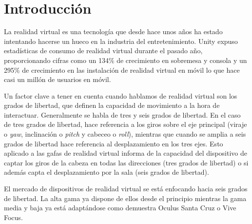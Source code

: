








\pagestyle{empty}
\chapter{Introducción}
La realidad virtual es una tecnología que desde hace unos años ha estado intentando hacerse un hueco en la industria del entretenimiento. Unity expuso estadísticas de consumo de realidad virtual durante el pasado año, proporcionando cifras como un 134\% de crecimiento en sobremesa y consola y un 295\% de crecimiento en las instalación de realidad virtual en móvil lo que hace casi un millón de usuarios en móvil.

Un factor clave a tener en cuenta cuando hablamos de realidad virtual son los grados de libertad, que definen la capacidad de movimiento a la hora de interactuar. Generalmente se habla de tres y seis grados de libertad. En el caso de tres grados de libertad, hace referencia a los giros sobre el eje principal (viraje o \textit{yaw}, inclinación o \textit{pitch} y cabeceo o \textit{roll}), mientras que cuando se amplia a seis grados de libertad hace referencia al desplazamiento en los tres ejes. Esto aplicado a las gafas de realidad virtual informa de la capacidad del dispositivo de captar los giros de la cabeza en todas las direcciones (tres grados de libertad) o si además capta el desplazamiento por la sala (seis grados de libertad).

El mercado de dispositivos de realidad virtual se está enfocando hacia seis grados de libertad. La alta gama ya dispone de ellos desde el principio mientras la gama media y baja ya está adaptándose como demuestra Oculus Santa Cruz o Vive Focus.

